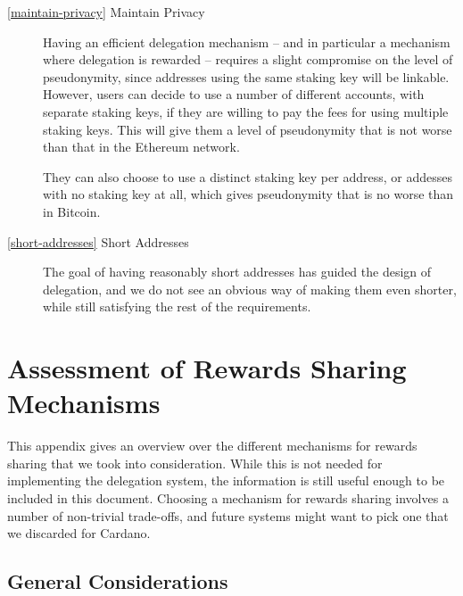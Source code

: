 \documentclass[11pt,a4paper,dvipsnames,twosided]{article}
\begin{document}
\begin{description}
\item[\cref{maintain-privacy} Maintain Privacy] Having an efficient
  delegation mechanism -- and in particular a mechanism where
  delegation is rewarded -- requires a slight compromise on the level
  of pseudonymity, since addresses using the same staking key will be
  linkable. However, users can decide to use a number of different
  accounts, with separate staking keys, if they are willing to pay the
  fees for using multiple staking keys. This will give them a level of
  pseudonymity that is not worse than that in the Ethereum network.

  They can also choose to use a distinct staking key per address, or addesses
  with no staking key at all, which gives pseudonymity that is no worse than in
  Bitcoin.

\item[\cref{short-addresses} Short Addresses] The goal of having
  reasonably short addresses has guided the design of delegation, and
  we do not see an obvious way of making them even shorter, while
  still satisfying the rest of the requirements.

\end{description}

\appendix

\section{Assessment of Rewards Sharing Mechanisms}
\label{assessment-of-rewards-sharing-mechanisms}

This appendix gives an overview over the different mechanisms for
rewards sharing that we took into consideration. While this is not
needed for implementing the delegation system, the information is
still useful enough to be included in this document. Choosing a
mechanism for rewards sharing involves a number of non-trivial
trade-offs, and future systems might want to pick one that we
discarded for Cardano.

\subsection{General Considerations}
\label{general-considerations}
\end{document}
